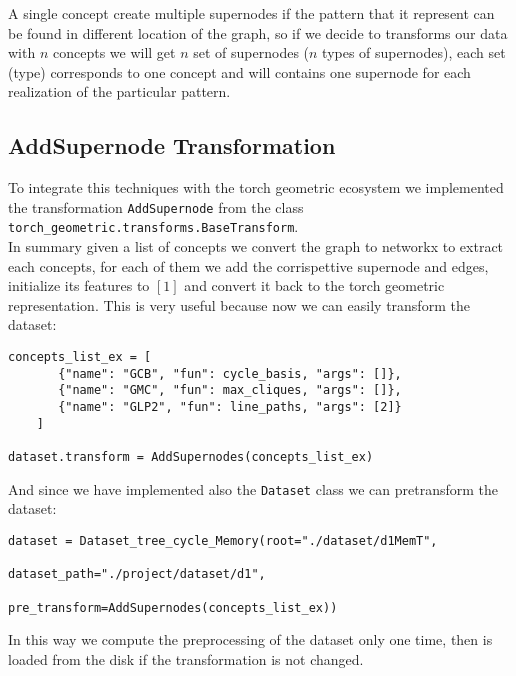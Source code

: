 \documentclass{article}
\begin{document}
    \noindent
    \begin{remark}
        A single concept create multiple supernodes if the pattern that it represent can be found in different location of the graph, so if we decide to transforms our data with \( n \) concepts we will get \( n \) set of supernodes (\( n \) types of supernodes), each set (type) corresponds to one concept and will contains one supernode for each realization of the particular pattern.
    \end{remark}

    \subsection{AddSupernode Transformation}
    To integrate this techniques with the torch geometric ecosystem we implemented the transformation \texttt{AddSupernode} from the class \texttt{torch\_geometric.transforms.BaseTransform}. \\
    In summary given a list of concepts we convert the graph to networkx to extract each concepts, for each of them we add the corrispettive supernode and edges, initialize its features to \( [1] \) and convert it back to the torch geometric representation.
    This is very useful because now we can easily transform the dataset:
    \begin{code}
        \noindent
        \begin{lstlisting}
concepts_list_ex = [
       {"name": "GCB", "fun": cycle_basis, "args": []},
       {"name": "GMC", "fun": max_cliques, "args": []},
       {"name": "GLP2", "fun": line_paths, "args": [2]}
    ]

dataset.transform = AddSupernodes(concepts_list_ex)
        \end{lstlisting}
    \end{code}

    \noindent
    And since we have implemented also the \texttt{Dataset} class we can pretransform the dataset:
    \begin{code}
        \noindent
        \begin{lstlisting}
dataset = Dataset_tree_cycle_Memory(root="./dataset/d1MemT",
                                    dataset_path="./project/dataset/d1",
                                    pre_transform=AddSupernodes(concepts_list_ex))
        \end{lstlisting}
    \end{code}
    \noindent
    In this way we compute the preprocessing of the dataset only one time, then is loaded from the disk if the transformation is not changed.
\end{document}
